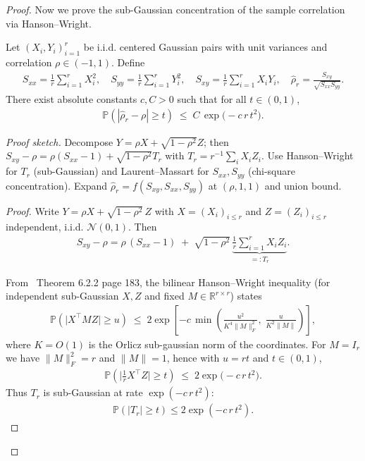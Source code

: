 \begin{proof}
Now we prove the sub-Gaussian concentration of the sample correlation via Hanson--Wright.
\begin{lemma}
    Let $(X_i,Y_i)_{i=1}^r$ be i.i.d. centered Gaussian pairs with unit variances and correlation $\rho\in(-1,1)$.
    Define
\begin{align}
    S_{xx}=\frac{1}{r}\sum_{i=1}^r X_i^2,\quad
    S_{yy}=\frac{1}{r}\sum_{i=1}^r Y_i^2,\quad
    S_{xy}=\frac{1}{r}\sum_{i=1}^r X_iY_i,\quad
    \hat{\rho}_r=\frac{S_{xy}}{\sqrt{S_{xx}S_{yy}}}.
\end{align}
    There exist absolute constants $c, C > 0$ such that for all $t\in(0,1)$,
\begin{align}
    \mathbb{P}\!\left(|\hat{\rho}_r-\rho|\ge t\right)
    \;\le\;
    C\,\exp\!\big(-c\,r\,t^2\big).
\end{align}
    \end{lemma}
    
    \textit{Proof sketch.} Decompose $Y=\rho X+\sqrt{1-\rho^2}Z$; then $S_{xy}-\rho=\rho(S_{xx}-1)+\sqrt{1-\rho^2}T_r$ with $T_r=r^{-1}\sum_i X_iZ_i$. Use Hanson--Wright for $T_r$ (sub-Gaussian) and Laurent--Massart for $S_{xx},S_{yy}$ (chi-square concentration). Expand $\hat{\rho}_r=f(S_{xy},S_{xx},S_{yy})$ at $(\rho,1,1)$ and union bound.
    \begin{proof}
    
    Write $Y=\rho X+\sqrt{1-\rho^2}\,Z$ with $X=(X_i)_{i\le r}$ and $Z=(Z_i)_{i\le r}$ independent, i.i.d. $\mathcal N(0,1)$.
    Then
\begin{align}
    S_{xy}-\rho
    = \rho\,(S_{xx}-1)\;+\;\sqrt{1-\rho^2}\,\underbrace{\frac{1}{r}\sum_{i=1}^r X_iZ_i}_{=:T_r}.
\end{align}
    
    
    From~\cite{vershynin2018highdimensionalprobability} Theorem 6.2.2 page 183, the bilinear Hanson--Wright inequality (for independent sub-Gaussian $X,Z$ and fixed $M\in\mathbb{R}^{r\times r}$) states
\begin{align}
    \mathbb{P}\!\left(\big|X^\top M Z\big| \ge u\right)
    \;\le\; 2\exp\!\left[-c\,\min\!\left(\frac{u^2}{K^4\|M\|_F^2},\;\frac{u}{K^2\|M\|}\right)\right],
\end{align}
    where $K=O(1)$ is the Orlicz sub-gaussian norm of the coordinates. For $M=I_r$ we have $\|M\|_F^2=r$ and $\|M\|=1$, hence with $u=r t$ and $t\in(0,1)$,
\begin{align}
    \mathbb{P}\!\left(\Big|\frac{1}{r}X^\top Z\Big|\ge t\right)
    \;\le\;2\exp\!\big(-c\,r\,t^2\big).
\end{align}
    Thus $T_r$ is sub-Gaussian at rate $\exp(-c\,r\,t^2)$:
\begin{align}
    \mathbb{P}\!\left(|T_r|\ge t\right)\le 2\exp(-c\,r\,t^2).
\end{align}
    

\end{proof}
\end{proof}
